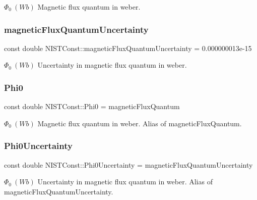$\Phi_0 \ (Wb)$ Magnetic flux quantum in weber. \mbox{\label{group___magnetic_flux_quantum_gabb501bffb2a565762d9f4bde15f859b6}} 
\subsubsection{\texorpdfstring{magnetic\+Flux\+Quantum\+Uncertainty}{magneticFluxQuantumUncertainty}}
{\footnotesize\ttfamily const double N\+I\+S\+T\+Const\+::magnetic\+Flux\+Quantum\+Uncertainty = 0.\+000000013e-\/15}

$\Phi_0 \ (Wb)$ Uncertainty in magnetic flux quantum in weber. \mbox{\label{group___magnetic_flux_quantum_ga17c4e5dc1a9ccc86990f9236ffbc42a3}} 
\subsubsection{\texorpdfstring{Phi0}{Phi0}}
{\footnotesize\ttfamily const double N\+I\+S\+T\+Const\+::\+Phi0 = magnetic\+Flux\+Quantum}

$\Phi_0 \ (Wb)$ Magnetic flux quantum in weber. Alias of magnetic\+Flux\+Quantum. \mbox{\label{group___magnetic_flux_quantum_ga55c653d0966d0e6adb13e664c811d394}} 
\subsubsection{\texorpdfstring{Phi0\+Uncertainty}{Phi0Uncertainty}}
{\footnotesize\ttfamily const double N\+I\+S\+T\+Const\+::\+Phi0\+Uncertainty = magnetic\+Flux\+Quantum\+Uncertainty}

$\Phi_0 \ (Wb)$ Uncertainty in magnetic flux quantum in weber. Alias of magnetic\+Flux\+Quantum\+Uncertainty. 